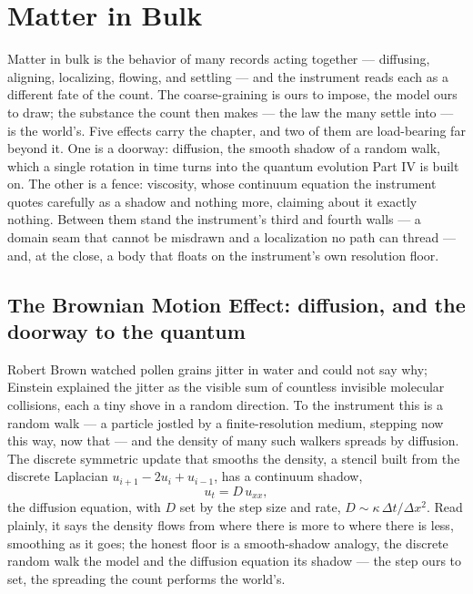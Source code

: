 \chapter{Matter in Bulk}
\label{chap:matter-in-bulk}

Matter in bulk is the behavior of many records acting together --- diffusing, aligning, localizing, flowing,
and settling --- and the instrument reads each as a different fate of the count. The coarse-graining is ours to
impose, the model ours to draw; the substance the count then makes --- the law the many settle into --- is the
world's. Five effects carry the chapter, and two of them are load-bearing far beyond it. One is a doorway:
diffusion, the smooth shadow of a random walk, which a single rotation in time turns into the quantum evolution
Part IV is built on. The other is a fence: viscosity, whose continuum equation the instrument quotes carefully
as a shadow and nothing more, claiming about it exactly nothing. Between them stand the instrument's third and
fourth walls --- a domain seam that cannot be misdrawn and a localization no path can thread --- and, at the
close, a body that floats on the instrument's own resolution floor.

\section{The Brownian Motion Effect: diffusion, and the doorway to the quantum}
\label{se:brownian}

Robert Brown watched pollen grains jitter in water and could not say why; Einstein explained the jitter as the
visible sum of countless invisible molecular collisions, each a tiny shove in a random direction. To the
instrument this is a random walk --- a particle jostled by a finite-resolution medium, stepping now this way,
now that --- and the density of many such walkers spreads by diffusion. The discrete symmetric update that
smooths the density, a stencil built from the discrete Laplacian $u_{i+1} - 2u_i + u_{i-1}$, has a continuum
shadow,
\begin{equation}
  u_t = D\,u_{xx},
\end{equation}
the diffusion equation, with $D$ set by the step size and rate, $D \sim \kappa\,\Delta t / \Delta x^2$. Read
plainly, it says the density flows from where there is more to where there is less, smoothing as it goes; the
honest floor is a smooth-shadow analogy, the discrete random walk the model and the diffusion equation its
shadow --- the step ours to set, the spreading the count performs the world's.

